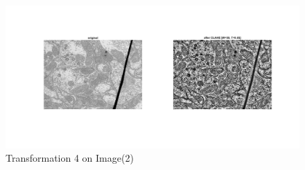 \documentclass[12pt, a4paper]{article}
\begin{document}
\renewcommand{\thefigure}{5.24}
\begin{figure}[H]
    \centering
    \vspace*{-30pt}
    \includegraphics[width=\textwidth]{e24.jpg}
    \vspace*{-80pt}
    \caption{Transformation 4 on Image(2)}
    \label{fig:5.24}
\end{figure}
\end{document}
